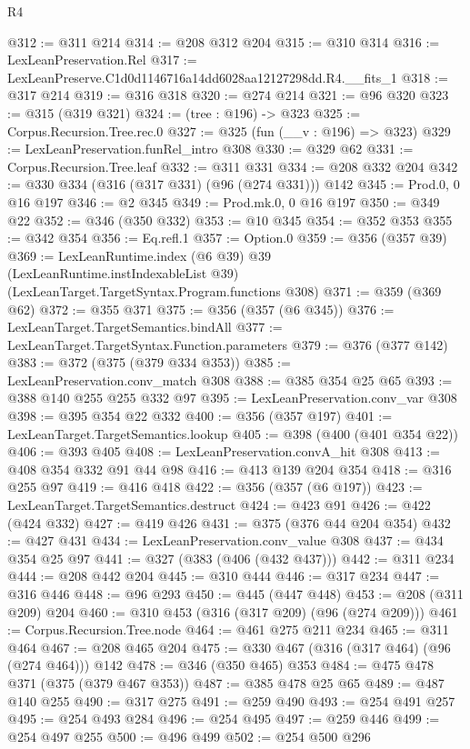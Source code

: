 \begin{lexlean}{R4}
\begin{coremodule}
@312 := @311 @214
@314 := @208 @312 @204
@315 := @310 @314
@316 := LexLeanPreservation.Rel
@317 := LexLeanPreserve.C1d0d1146716a14dd6028aa12127298dd.R4.__fits_1
@318 := @317 @214
@319 := @316 @318
@320 := @274 @214
@321 := @96 @320
@323 := @315 (@319 @321)
@324 := (tree : @196) -> @323
@325 := Corpus.Recursion.Tree.rec.{0}
@327 := @325 (fun (__v : @196) => @323)
@329 := LexLeanPreservation.funRel_intro @308
@330 := @329 @62
@331 := Corpus.Recursion.Tree.leaf
@332 := @311 @331
@334 := @208 @332 @204
@342 := @330 @334 (@316 (@317 @331) (@96 (@274 @331))) @142
@345 := Prod.{0, 0} @16 @197
@346 := @2 @345
@349 := Prod.mk.{0, 0} @16 @197
@350 := @349 @22
@352 := @346 (@350 @332)
@353 := @10 @345
@354 := @352 @353
@355 := @342 @354
@356 := Eq.refl.{1}
@357 := Option.{0}
@359 := @356 (@357 @39)
@369 := LexLeanRuntime.index
    (@6 @39)
    @39
    (LexLeanRuntime.instIndexableList @39)
    (LexLeanTarget.TargetSyntax.Program.functions @308)
@371 := @359 (@369 @62)
@372 := @355 @371
@375 := @356 (@357 (@6 @345))
@376 := LexLeanTarget.TargetSemantics.bindAll
@377 := LexLeanTarget.TargetSyntax.Function.parameters
@379 := @376 (@377 @142)
@383 := @372 (@375 (@379 @334 @353))
@385 := LexLeanPreservation.conv_match @308
@388 := @385 @354 @25 @65
@393 := @388 @140 @255 @255 @332 @97
@395 := LexLeanPreservation.conv_var @308
@398 := @395 @354 @22 @332
@400 := @356 (@357 @197)
@401 := LexLeanTarget.TargetSemantics.lookup
@405 := @398 (@400 (@401 @354 @22))
@406 := @393 @405
@408 := LexLeanPreservation.convA_hit @308
@413 := @408 @354 @332 @91 @44 @98
@416 := @413 @139 @204 @354
@418 := @316 @255 @97
@419 := @416 @418
@422 := @356 (@357 (@6 @197))
@423 := LexLeanTarget.TargetSemantics.destruct
@424 := @423 @91
@426 := @422 (@424 @332)
@427 := @419 @426
@431 := @375 (@376 @44 @204 @354)
@432 := @427 @431
@434 := LexLeanPreservation.conv_value @308
@437 := @434 @354 @25 @97
@441 := @327 (@383 (@406 (@432 @437)))
@442 := @311 @234
@444 := @208 @442 @204
@445 := @310 @444
@446 := @317 @234
@447 := @316 @446
@448 := @96 @293
@450 := @445 (@447 @448)
@453 := @208 (@311 @209) @204
@460 := @310 @453 (@316 (@317 @209) (@96 (@274 @209)))
@461 := Corpus.Recursion.Tree.node
@464 := @461 @275 @211 @234
@465 := @311 @464
@467 := @208 @465 @204
@475 := @330 @467 (@316 (@317 @464) (@96 (@274 @464))) @142
@478 := @346 (@350 @465) @353
@484 := @475 @478 @371 (@375 (@379 @467 @353))
@487 := @385 @478 @25 @65
@489 := @487 @140 @255
@490 := @317 @275
@491 := @259 @490
@493 := @254 @491 @257
@495 := @254 @493 @284
@496 := @254 @495
@497 := @259 @446
@499 := @254 @497 @255
@500 := @496 @499
@502 := @254 @500 @296

\end{coremodule}
\end{lexlean}
